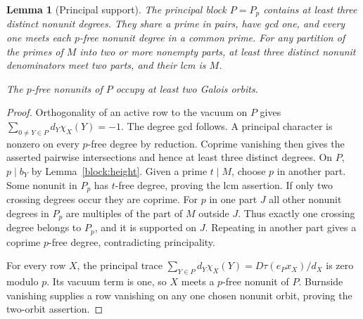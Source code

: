 \documentclass[11pt]{amsart}
\numberwithin{equation}{section}
\newtheorem{lemma}[theorem]{Lemma}
\theoremstyle{definition}
\theoremstyle{plain}
\begin{document}
\begin{lemma}[Principal support]\label{block:witness}
The principal block $P=P_p$ contains at least three distinct nonunit
degrees. They share a prime in pairs, have gcd one, and every one
meets each $p$-free nonunit degree in a common prime. For any
partition of the primes of $M$ into two or more nonempty parts,
at least three distinct nonunit denominators meet two parts, and
their lcm is $M$.

The $p$-free nonunits of $P$ occupy at least two Galois orbits.
\end{lemma}
\begin{proof}
Orthogonality of an active row to the vacuum on $P$ gives
$\sum_{0\ne Y\in P}d_Y\chi_X(Y)=-1$. The degree gcd follows.
A principal character is nonzero on every $p$-free degree by
reduction. Coprime vanishing then gives the asserted pairwise
intersections and hence at least three distinct degrees. On $P$,
$p\mid b_Y$ by Lemma~\ref{block:height}. Given a prime $t\mid M$,
choose $p$ in another part. Some nonunit in $P_p$ has $t$-free
degree, proving the lcm assertion. If only two crossing degrees
occur they are coprime. For $p$ in one part $J$ all other nonunit
degrees in $P_p$ are multiples of the part of $M$ outside $J$.
Thus exactly one crossing degree belongs to $P_p$, and it is
supported on $J$. Repeating in another part gives a coprime
$p$-free degree, contradicting principality.

For every row $X$, the principal trace
$\sum_{Y\in P}d_Y\chi_X(Y)=D\tau(e_Px_X)/d_X$ is zero modulo $p$.
Its vacuum term is one, so $X$ meets a $p$-free nonunit of $P$.
Burnside vanishing supplies a row vanishing on any one chosen
nonunit orbit, proving the two-orbit assertion.
\end{proof}
\end{document}
